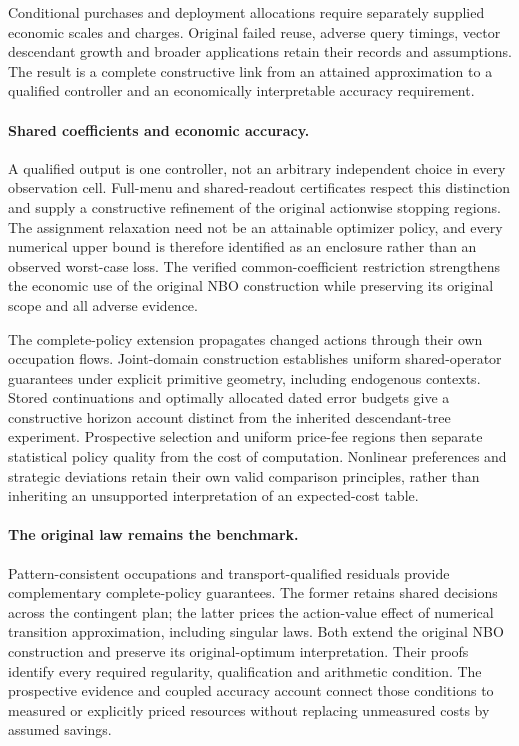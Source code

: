 \documentclass[ecta,nameyear,draft]{econsocart}
\begin{document}
Conditional purchases and deployment allocations require separately supplied economic scales and charges. Original failed reuse, adverse query timings, vector descendant growth and broader applications retain their records and assumptions. The result is a complete constructive link from an attained approximation to a qualified controller and an economically interpretable accuracy requirement.

\paragraph{Shared coefficients and economic accuracy.}
A qualified output is one controller, not an arbitrary independent choice in every observation cell. Full-menu and shared-readout certificates respect this distinction and supply a constructive refinement of the original actionwise stopping regions. The assignment relaxation need not be an attainable optimizer policy, and every numerical upper bound is therefore identified as an enclosure rather than an observed worst-case loss. The verified common-coefficient restriction strengthens the economic use of the original NBO construction while preserving its original scope and all adverse evidence.

The complete-policy extension propagates changed actions through their own occupation flows. Joint-domain construction establishes uniform shared-operator guarantees under explicit primitive geometry, including endogenous contexts. Stored continuations and optimally allocated dated error budgets give a constructive horizon account distinct from the inherited descendant-tree experiment. Prospective selection and uniform price-fee regions then separate statistical policy quality from the cost of computation. Nonlinear preferences and strategic deviations retain their own valid comparison principles, rather than inheriting an unsupported interpretation of an expected-cost table.


\paragraph{The original law remains the benchmark.}
Pattern-consistent occupations and transport-qualified residuals provide complementary complete-policy guarantees. The former retains shared decisions across the contingent plan; the latter prices the action-value effect of numerical transition approximation, including singular laws. Both extend the original NBO construction and preserve its original-optimum interpretation. Their proofs identify every required regularity, qualification and arithmetic condition. The prospective evidence and coupled accuracy account connect those conditions to measured or explicitly priced resources without replacing unmeasured costs by assumed savings.
\end{document}
